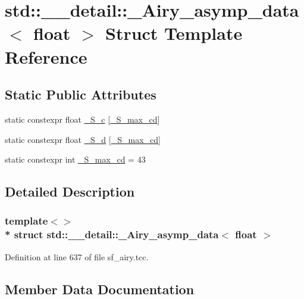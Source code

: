 \hypertarget{structstd_1_1____detail_1_1__Airy__asymp__data_3_01float_01_4}{}\section{std\+:\+:\+\_\+\+\_\+detail\+:\+:\+\_\+\+Airy\+\_\+asymp\+\_\+data$<$ float $>$ Struct Template Reference}
\label{structstd_1_1____detail_1_1__Airy__asymp__data_3_01float_01_4}
\subsection*{Static Public Attributes}
\begin{DoxyCompactItemize}
\item 
static constexpr float \hyperlink{structstd_1_1____detail_1_1__Airy__asymp__data_3_01float_01_4_a8fc68acdbcbc59f4ecfdd4bc2f4f2a1e}{\+\_\+\+S\+\_\+c} \mbox{[}\hyperlink{structstd_1_1____detail_1_1__Airy__asymp__data_3_01float_01_4_ac0e59b83a90623587f20cdc32a9e7565}{\+\_\+\+S\+\_\+max\+\_\+cd}\mbox{]}
\item 
static constexpr float \hyperlink{structstd_1_1____detail_1_1__Airy__asymp__data_3_01float_01_4_ad947443d5860fcd25d25ad6d04ea3bb3}{\+\_\+\+S\+\_\+d} \mbox{[}\hyperlink{structstd_1_1____detail_1_1__Airy__asymp__data_3_01float_01_4_ac0e59b83a90623587f20cdc32a9e7565}{\+\_\+\+S\+\_\+max\+\_\+cd}\mbox{]}
\item 
static constexpr int \hyperlink{structstd_1_1____detail_1_1__Airy__asymp__data_3_01float_01_4_ac0e59b83a90623587f20cdc32a9e7565}{\+\_\+\+S\+\_\+max\+\_\+cd} = 43
\end{DoxyCompactItemize}


\subsection{Detailed Description}
\subsubsection*{template$<$$>$\\*
struct std\+::\+\_\+\+\_\+detail\+::\+\_\+\+Airy\+\_\+asymp\+\_\+data$<$ float $>$}



Definition at line 637 of file sf\+\_\+airy.\+tcc.



\subsection{Member Data Documentation}
